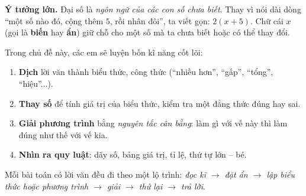 \providecommand{\aeaBox}[4]{\begin{tikzpicture}[baseline=-0.7ex,font=\small]
  \draw[Navy,line width=0.8pt,fill=tmBlue!6] (-0.66,-0.32) rectangle (0.66,0.32);
  \draw[Navy,line width=0.8pt] (0,-0.32)--(0,0.32) (-0.66,0)--(0.66,0);
  \node[inner sep=0pt] at (-0.33,0.16){$#1$};\node[inner sep=0pt] at (0.33,0.16){$#2$};
  \node[inner sep=0pt] at (-0.33,-0.16){$#3$};\node[inner sep=0pt] at (0.33,-0.16){$#4$};\end{tikzpicture}}
\providecommand{\rvaaScale}[2]{\begin{tikzpicture}[baseline=0pt,font=\small]
  \draw[Ink,line width=1.1pt] (-2.3,0)--(2.3,0);
  \fill[Slate] (0,-0.02)--(-0.22,-0.38)--(0.22,-0.38)--cycle;
  \draw[Slate,line width=1pt] (-0.4,-0.38)--(0.4,-0.38);
  \node[anchor=south,inner sep=0pt] at (-1.3,0.04){#1};\node[anchor=south,inner sep=0pt] at (1.3,0.04){#2};\end{tikzpicture}}
\providecommand{\rvaaSq}{\tikz[baseline=0pt]{\draw[tmBlue!80!black,line width=0.8pt,fill=tmBlue!25] (0,0) rectangle (0.3,0.3);}}
\providecommand{\rvaaTri}{\tikz[baseline=0pt]{\draw[tmOrange!85!black,line width=0.8pt,fill=tmOrange!25] (0,0)--(0.34,0)--(0.17,0.3)--cycle;}}
\providecommand{\rvaaCir}{\tikz[baseline=0pt]{\draw[tmGreen!80!black,line width=0.8pt,fill=tmGreen!25] (0.15,0.15) circle (0.15);}}
\providecommand{\rvaaWt}[1]{\tikz[baseline=0pt]{\node[draw=Ink,line width=0.6pt,anchor=south,inner sep=2pt,font=\footnotesize] at (0,0){#1};}}

\begin{knowbox}
\textbf{Ý tưởng lớn.} Đại số là \emph{ngôn ngữ của các con số chưa biết}. Thay vì nói dài dòng
``một số nào đó, cộng thêm $5$, rồi nhân đôi'', ta viết gọn: $2(x+5)$. Chữ cái $x$ (gọi là
\textbf{biến} hay \textbf{ẩn}) giữ chỗ cho một số mà ta chưa biết hoặc có thể thay đổi.

Trong chủ đề này, các em sẽ luyện bốn kĩ năng cốt lõi:
\begin{enumerate}[leftmargin=1.4em,itemsep=1pt,topsep=2pt]
\item \textbf{Dịch} lời văn thành biểu thức, công thức (``nhiều hơn'', ``gấp'', ``tổng'', ``hiệu''...).
\item \textbf{Thay số} để tính giá trị của biểu thức, kiểm tra một đẳng thức đúng hay sai.
\item \textbf{Giải phương trình} bằng \emph{nguyên tắc cân bằng}: làm gì với vế này thì làm đúng như thế với vế kia.
\item \textbf{Nhìn ra quy luật}: dãy số, bảng giá trị, tỉ lệ, thứ tự lớn -- bé.
\end{enumerate}
Mỗi bài toán có lời văn đều đi theo một lộ trình: \emph{đọc kĩ $\to$ đặt ẩn $\to$ lập biểu thức
hoặc phương trình $\to$ giải $\to$ thử lại $\to$ trả lời}.
\end{knowbox}
\vspace{0.3cm}

